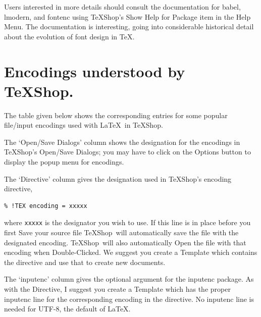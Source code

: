\documentclass[letterpaper,11pt]{article}
\newcommand{\TS}{\textsf{\TeX Shop}}
\newcommand{\acr}[1]{\textsf{#1}}
\newcommand{\cmd}[1]{\textsf{#1}}
\begin{document}
Users interested in more details should consult the documentation for \cmd{babel}, \cmd{lmodern},
and \cmd{fontenc} using \TS's \cmd{Show Help for Package} item in the \cmd{Help} Menu. The documentation
is interesting, going into considerable historical detail about the evolution of font design in \TeX.



\section{Encodings understood by \TS.}\label{thetable}

The table given below shows the corresponding entries for some popular file/input encodings used with \LaTeX\ in \TS.

The `Open/Save Dialogs' column shows the designation for the encodings in \TS's Open/Save Dialogs; you may have to click on the \cmd{Options} button to display the popup menu for encodings. 

The `Directive' column gives the designation used in \TS's encoding directive,
\begin{verbatim}
% !TEX encoding = xxxxx
\end{verbatim}
where \texttt{xxxxx} is the designator you wish to use. If this line is in place before you first \cmd{Save} your source file \TS\ will automatically save the file with the designated encoding. \TS\ will also automatically \cmd{Open} the file with that encoding when \cmd{Double-Clicked}. We suggest you create a Template which contains the directive and use that to create new documents.

The `inputenc' column gives the optional argument for the inputenc package. As with the Directive, I suggest you create a Template which has the proper inputenc line for the corresponding encoding in the directive. No inputenc line is needed for \acr{UTF-8}, the default of \LaTeX.
\end{document}
